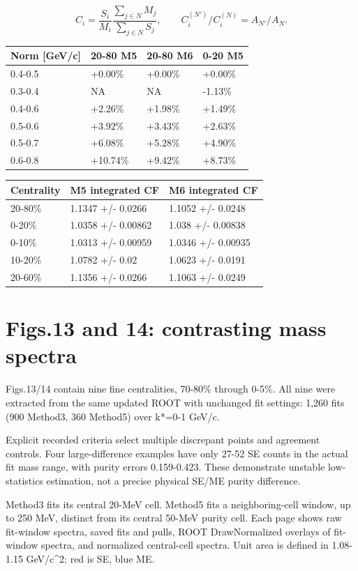 \documentclass[10pt,a4paper]{article}
\begin{document}
\[C_i=\frac{S_i}{M_i}\frac{\sum_{j\in N}M_j}{\sum_{j\in N}S_j},\qquad C_i^{(N')}/C_i^{(N)}=A_{N'}/A_N.\]
{\small\setlength{\tabcolsep}{3pt}\begin{longtable}{llll}\toprule
Norm [GeV/c] & 20-80 M5 & 20-80 M6 & 0-20 M5\\\midrule\endhead
0.4-0.5 & +0.00\% & +0.00\% & +0.00\%\\
0.3-0.4 & NA & NA & -1.13\%\\
0.4-0.6 & +2.26\% & +1.98\% & +1.49\%\\
0.5-0.6 & +3.92\% & +3.43\% & +2.63\%\\
0.5-0.7 & +6.08\% & +5.28\% & +4.90\%\\
0.6-0.8 & +10.74\% & +9.42\% & +8.73\%\\
\bottomrule\end{longtable}}
{\small\setlength{\tabcolsep}{3pt}\begin{longtable}{lll}\toprule
Centrality & M5 integrated CF & M6 integrated CF\\\midrule\endhead
20-80\% & 1.1347 +/- 0.0266 & 1.1052 +/- 0.0248\\
0-20\% & 1.0358 +/- 0.00862 & 1.038 +/- 0.00838\\
0-10\% & 1.0313 +/- 0.00959 & 1.0346 +/- 0.00935\\
10-20\% & 1.0782 +/- 0.02 & 1.0623 +/- 0.0191\\
20-60\% & 1.1356 +/- 0.0266 & 1.1063 +/- 0.0249\\
\bottomrule\end{longtable}}
\clearpage
\section*{Figs.13 and 14: contrasting mass spectra}
Figs.13/14 contain nine fine centralities, 70-80\% through 0-5\%. All nine were extracted from the same updated ROOT with unchanged fit settings: 1,260 fits (900 Method3, 360 Method5) over k*=0-1 GeV/c.

Explicit recorded criteria select multiple discrepant points and agreement controls. Four large-difference examples have only 27-52 SE counts in the actual fit mass range, with purity errors 0.159-0.423. These demonstrate unstable low-statistics estimation, not a precise physical SE/ME purity difference.

Method3 fits its central 20-MeV cell. Method5 fits a neighboring-cell window, up to 250 MeV, distinct from its central 50-MeV purity cell. Each page shows raw fit-window spectra, saved fits and pulls, ROOT DrawNormalized overlays of fit-window spectra, and normalized central-cell spectra. Unit area is defined in 1.08-1.15 GeV/c\textasciicircum{}2; red is SE, blue ME.
\end{document}

